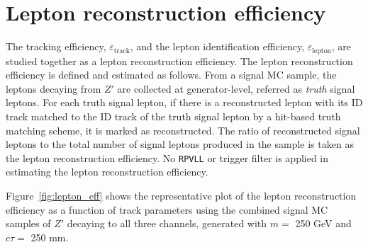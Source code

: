 \section{Lepton reconstruction efficiency}
\label{sec:tracking_efficiency}
The tracking efficiency, $\varepsilon_{\mathrm{track}}$, and the lepton identification efficiency, $\varepsilon_{\mathrm{lepton}}$, are studied together as a lepton reconstruction efficiency. The lepton reconstruction efficiency is defined and estimated as follows. From a signal MC sample, the leptons decaying from $Z'$ are collected at generator-level, referred as \textit{truth} signal leptons. For each truth signal lepton, if there is a reconstructed lepton with its ID track matched to the ID track of the truth signal lepton by a hit-based truth matching scheme, it is marked as reconstructed. The ratio of reconstructed signal leptons to the total number of signal leptons produced in the sample is taken as the lepton reconstruction efficiency. No \texttt{RPVLL} or trigger filter is applied in estimating the lepton reconstruction efficiency.

Figure~\ref{fig:lepton_eff} shows the representative plot of the lepton reconstruction efficiency as a function of track parameters using the combined signal MC samples of $Z'$ decaying to all three channels, generated with $m = $ 250 GeV and $c\tau=$ 250 mm.

